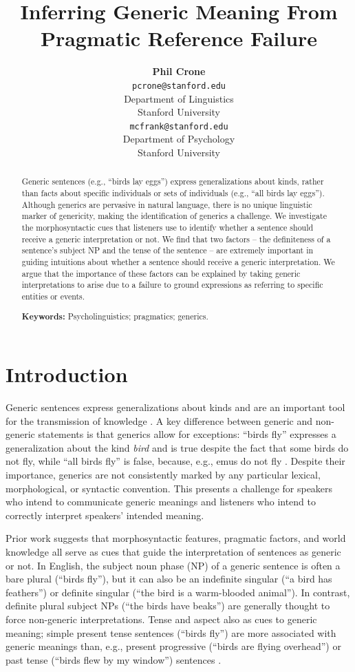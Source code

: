 \documentclass[10pt,letterpaper]{article}
\title{Inferring Generic Meaning From Pragmatic Reference Failure}
\author{{\large \bf Phil Crone} \\
	\texttt{pcrone@stanford.edu}\\
  Department of Linguistics \\
  Stanford University
  \And {\large \bf Michael C. Frank} \\
  \texttt{mcfrank@stanford.edu}\\
  Department of Psychology \\
  Stanford University}
\begin{document}
\maketitle

\begin{abstract}
Generic sentences (e.g., ``birds lay eggs'') express generalizations about kinds, rather than facts about specific individuals or sets of individuals (e.g., ``all birds lay eggs''). Although generics are pervasive in natural language, there is no unique linguistic marker of genericity, making the identification of generics a challenge. We investigate the morphosyntactic cues that listeners use to identify whether a sentence should receive a generic interpretation or not. We find that two factors -- the definiteness of a sentence's subject NP and the tense of the sentence -- are extremely important in guiding intuitions about whether a sentence should receive a generic interpretation. We argue that the importance of these factors can be explained by taking generic interpretations to arise due to a failure to ground expressions as referring to specific entities or events.

\textbf{Keywords:} Psycholinguistics; pragmatics; generics.
\end{abstract}


\section{Introduction}

Generic sentences express generalizations about kinds and are an important tool for the transmission of knowledge \cite{gelman2003}. A key difference between generic and non-generic statements is that generics allow for exceptions: ``birds fly'' expresses a generalization about the kind \textit{bird} and is true despite the fact that some birds do not fly, while ``all birds fly'' is false, because, e.g., emus do not fly \cite{Prasada:2000}. Despite their importance, generics are not consistently marked by any particular lexical, morphological, or syntactic convention. This presents a challenge for speakers who intend to communicate generic meanings and listeners who intend to correctly interpret speakers' intended meaning.

Prior work suggests that morphosyntactic features, pragmatic factors, and world knowledge all serve as cues that guide the interpretation of sentences as generic or not. In English, the subject noun phase (NP) of a generic sentence is often a bare plural (``birds fly''), but it can also be an indefinite singular (``a bird has feathers'') or definite singular (``the bird is a warm-blooded animal''). In contrast, definite plural subject NPs (``the birds have beaks'') are generally thought to force non-generic interpretations. Tense and aspect also as cues to generic meaning; simple present tense sentences (``birds fly'') are more associated with generic meanings than, e.g., present progressive (``birds are flying overhead'') or past tense (``birds flew by my window'') sentences \cite{Carlson:1977,Krifka:1995,Lyons:1977}.
\end{document}
